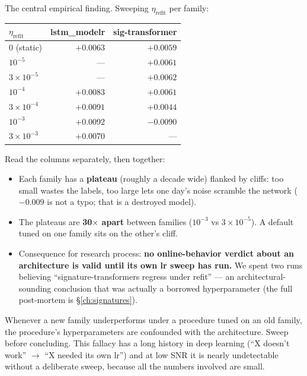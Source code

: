 The central empirical finding. Sweeping $\eta_{\text{refit}}$ per family:

\begin{center}
\begin{tabular}{@{}lrr@{}}
\toprule
$\eta_{\text{refit}}$ & lstm\_modelr & sig-transformer \\
\midrule
$0$ (static) & $+0.0063$ & $+0.0059$ \\
$10^{-5}$ & --- & $+0.0061$ \\
$3\times10^{-5}$ & --- & $\bm{+0.0062}$ \\
$10^{-4}$ & $+0.0083$ & $+0.0061$ \\
$3\times10^{-4}$ & $+0.0091$ & $+0.0044$ \\
$10^{-3}$ & $\bm{+0.0092}$ & $-0.0090$ \\
$3\times10^{-3}$ & $+0.0070$ & --- \\
\bottomrule
\end{tabular}
\end{center}

Read the columns separately, then together:

\begin{itemize}
\item Each family has a \textbf{plateau} (roughly a decade wide) flanked
  by cliffs: too small wastes the labels, too large lets one day's noise
  scramble the network ($-0.009$ is not a typo; that is a destroyed
  model).
\item The plateaus are \textbf{30$\times$ apart} between families
  ($10^{-3}$ vs $3\times10^{-5}$). A default tuned on one family sits on
  the other's cliff.
\item Consequence for research process: \textbf{no online-behavior verdict
  about an architecture is valid until its own lr sweep has run.} We
  spent two runs believing ``signature-transformers regress under refit''
  --- an architectural-sounding conclusion that was actually a borrowed
  hyperparameter (the full post-mortem is \S\ref{ch:signatures}).
\end{itemize}

\begin{warnbox}
Whenever a new family underperforms under a procedure tuned on an old
family, the procedure's hyperparameters are confounded with the
architecture. Sweep before concluding. This fallacy has a long history in
deep learning (``X doesn't work'' $\to$ ``X needed its own lr'') and at
low SNR it is nearly undetectable without a deliberate sweep, because all
the numbers involved are small.
\end{warnbox}

